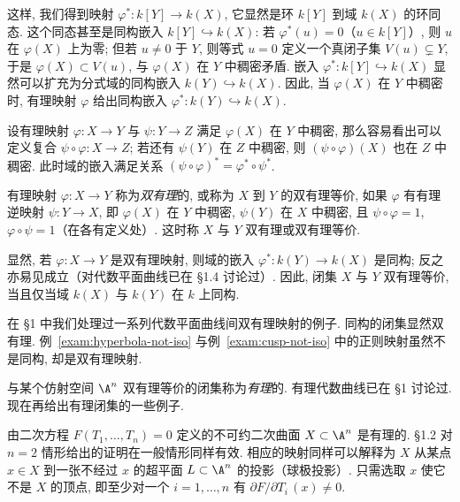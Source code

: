 这样, 我们得到映射 $\varphi^*: k[Y] \to k(X)$, 它显然是环 $k[Y]$ 到域 $k(X)$ 的环同态. 这个同态甚至是同构嵌入 $k[Y] \hookrightarrow k(X)$: 若 $\varphi^*(u) = 0$（$u \in k[Y]$）, 则 $u$ 在 $\varphi(X)$ 上为零; 但若 $u \ne 0$ 于 $Y$, 则等式 $u = 0$ 定义一个真闭子集 $V(u) \subsetneq Y$, 于是 $\varphi(X) \subset V(u)$, 与 $\varphi(X)$ 在 $Y$ 中稠密矛盾. 嵌入 $\varphi^*: k[Y] \hookrightarrow k(X)$ 显然可以扩充为分式域的同构嵌入 $k(Y) \hookrightarrow k(X)$. 因此, 当 $\varphi(X)$ 在 $Y$ 中稠密时, 有理映射 $\varphi$ 给出同构嵌入 $\varphi^*: k(Y) \hookrightarrow k(X)$.

设有理映射 $\varphi: X \to Y$ 与 $\psi: Y \to Z$ 满足 $\varphi(X)$ 在 $Y$ 中稠密, 那么容易看出可以定义复合 $\psi \circ \varphi: X \to Z$; 若还有 $\psi(Y)$ 在 $Z$ 中稠密, 则 $(\psi \circ \varphi)(X)$ 也在 $Z$ 中稠密. 此时域的嵌入满足关系 $(\psi \circ \varphi)^* = \varphi^* \circ \psi^*$.

\begin{definition}[双有理映射]\label{def:birational-affine}
	有理映射 $\varphi: X \to Y$ 称为\emph{双有理}的, 或称为 $X$ 到 $Y$ 的双有理等价, 如果 $\varphi$ 有有理逆映射 $\psi: Y \to X$, 即 $\varphi(X)$ 在 $Y$ 中稠密, $\psi(Y)$ 在 $X$ 中稠密, 且 $\psi \circ \varphi = 1$, $\varphi \circ \psi = 1$（在各有定义处）. 这时称 $X$ 与 $Y$ 双有理或双有理等价.
\end{definition}

显然, 若 $\varphi: X \to Y$ 是双有理映射, 则域的嵌入 $\varphi^*: k(Y) \to k(X)$ 是同构; 反之亦易见成立（对代数平面曲线已在 §1.4 讨论过）. 因此, 闭集 $X$ 与 $Y$ 双有理等价, 当且仅当域 $k(X)$ 与 $k(Y)$ 在 $k$ 上同构.

在 §1 中我们处理过一系列代数平面曲线间双有理映射的例子. 同构的闭集显然双有理. 例~\ref{exam:hyperbola-not-iso} 与例~\ref{exam:cusp-not-iso} 中的正则映射虽然不是同构, 却是双有理映射.

与某个仿射空间 $\A^n$ 双有理等价的闭集称为\emph{有理}的. 有理代数曲线已在 §1 讨论过. 现在再给出有理闭集的一些例子.

\begin{example}\label{exam:quadric-rational}
	由二次方程 $F(T_1, \ldots, T_n) = 0$ 定义的不可约二次曲面 $X \subset \A^n$ 是有理的. §1.2 对 $n = 2$ 情形给出的证明在一般情形同样有效. 相应的映射同样可以解释为 $X$ 从某点 $x \in X$ 到一张不经过 $x$ 的超平面 $L \subset \A^n$ 的投影（球极投影）. 只需选取 $x$ 使它不是 $X$ 的顶点, 即至少对一个 $i = 1, \ldots, n$ 有 $\partial F / \partial T_i\,(x) \ne 0$.
\end{example}

